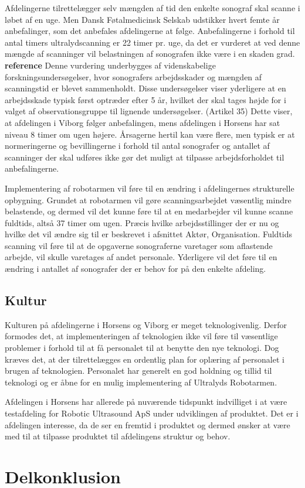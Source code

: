 Afdelingerne tilrettelægger selv mængden af tid den enkelte sonograf skal scanne i løbet af en uge. Men Dansk Føtalmedicinsk Selskab udstikker hvert femte år anbefalinger, som det anbefales afdelingerne at følge. Anbefalingerne i forhold til antal timers ultralydscanning er 22 timer pr. uge, da det er vurderet at ved denne mængde af scanninger vil belastningen af sonografen ikke være i en skaden grad. \textbf{reference} Denne vurdering underbygges af videnskabelige forskningsundersøgelser, hvor sonografers arbejdsskader og mængden af scanningstid er blevet sammenholdt. Disse undersøgelser viser yderligere at en arbejdsskade typisk først optræder efter 5 år, hvilket der skal tages højde for i valget af observationsgruppe til lignende undersøgelser. (Artikel 35)
Dette viser, at afdelingen i Viborg følger anbefalingen, mens afdelingen i Horsens har sat niveau 8 timer om ugen højere. Årsagerne hertil kan være flere, men typisk er at normeringerne og bevillingerne i forhold til antal sonografer og antallet af scanninger der skal udføres ikke gør det muligt at tilpasse arbejdsforholdet til anbefalingerne. 

Implementering af robotarmen vil føre til en ændring i afdelingernes strukturelle opbygning. Grundet at robotarmen vil gøre scanningsarbejdet væsentlig mindre belastende, og dermed vil det kunne føre til at en medarbejder vil kunne scanne fuldtids, altså 37 timer om ugen. Præcis hvilke arbejdsstillinger der er nu og hvilke det vil ændre sig til er beskrevet i afsnittet Aktør, Organisation. Fuldtids scanning vil føre til at de opgaverne sonograferne varetager som aflastende arbejde, vil skulle varetages af andet personale. Yderligere vil det føre til en ændring i antallet af sonografer der er behov for på den enkelte afdeling.

\subsection{Kultur}
Kulturen på afdelingerne i Horsens og Viborg er meget teknologivenlig. Derfor formodes det, at implementeringen af teknologien ikke vil føre til væsentlige problemer i forhold til at få personalet til at benytte den nye teknologi. Dog kræves det, at der tilrettelægges en ordentlig plan for oplæring af personalet i brugen af teknologien. Personalet har generelt en god holdning og tillid til teknologi og er åbne for en mulig implementering af Ultralyds Robotarmen.

Afdelingen i Horsens har allerede på nuværende tidspunkt indvilliget i at være testafdeling for Robotic Ultrasound ApS under udviklingen af produktet. Det er i afdelingen interesse, da de ser en fremtid i produktet og dermed ønsker at være med til at tilpasse produktet til afdelingens struktur og behov.   

\section{Delkonklusion}

